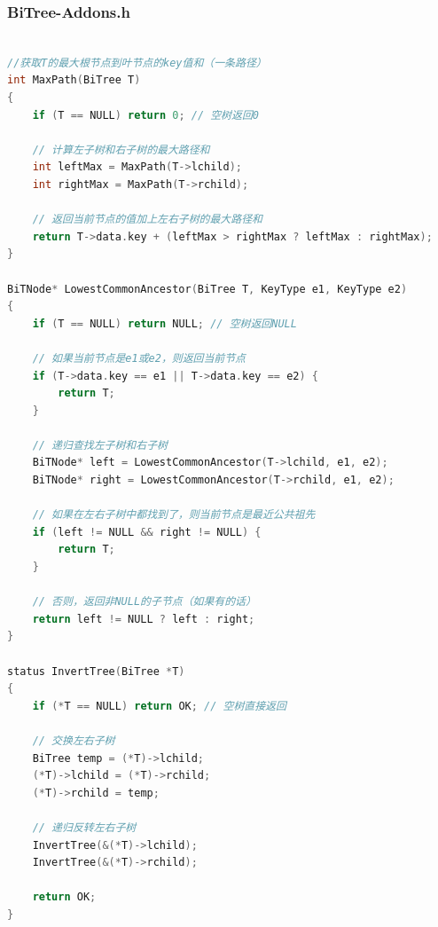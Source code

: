 \documentclass[supercite]{Experimental_Report}
\theoremstyle{definition}
\begin{document}
\subsubsection*{BiTree-Addons.h}
\begin{lstlisting}[language=C, caption={BiTree-Addons.h}, label=lst:bi_tree_addons_h]

//获取T的最大根节点到叶节点的key值和（一条路径）
int MaxPath(BiTree T)
{
    if (T == NULL) return 0; // 空树返回0

    // 计算左子树和右子树的最大路径和
    int leftMax = MaxPath(T->lchild);
    int rightMax = MaxPath(T->rchild);

    // 返回当前节点的值加上左右子树的最大路径和
    return T->data.key + (leftMax > rightMax ? leftMax : rightMax);
}

BiTNode* LowestCommonAncestor(BiTree T, KeyType e1, KeyType e2)
{
    if (T == NULL) return NULL; // 空树返回NULL

    // 如果当前节点是e1或e2，则返回当前节点
    if (T->data.key == e1 || T->data.key == e2) {
        return T;
    }

    // 递归查找左子树和右子树
    BiTNode* left = LowestCommonAncestor(T->lchild, e1, e2);
    BiTNode* right = LowestCommonAncestor(T->rchild, e1, e2);

    // 如果在左右子树中都找到了，则当前节点是最近公共祖先
    if (left != NULL && right != NULL) {
        return T;
    }

    // 否则，返回非NULL的子节点（如果有的话）
    return left != NULL ? left : right;
}

status InvertTree(BiTree *T)
{
    if (*T == NULL) return OK; // 空树直接返回

    // 交换左右子树
    BiTree temp = (*T)->lchild;
    (*T)->lchild = (*T)->rchild;
    (*T)->rchild = temp;

    // 递归反转左右子树
    InvertTree(&(*T)->lchild);
    InvertTree(&(*T)->rchild);

    return OK;
}

\end{lstlisting}
\end{document}
